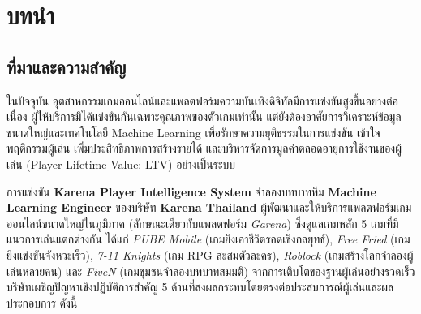 \documentclass[11pt,a4paper]{article}
\newcommand{\thaiFrontPage}{%
    \ifcase\value{page}\or ก\or ข\or ค\or ง\or จ\or ฉ\or ช\or ซ\else\arabic{page}\fi%
}
\renewcommand{\contentsname}{สารบัญ}
\begin{document}
\restoregeometry

\clearpage
{}
\renewcommand{\thepage}{\thaiFrontPage}
\renewcommand{\contentsname}{สารบัญ}
\tableofcontents

\clearpage
{}
\renewcommand{\thepage}{\arabic{page}}
\setlength{\parindent}{1.0cm}

\section{บทนำ}

\subsection{ที่มาและความสำคัญ}

ในปัจจุบัน อุตสาหกรรมเกมออนไลน์และแพลตฟอร์มความบันเทิงดิจิทัลมีการแข่งขันสูงขึ้นอย่างต่อเนื่อง ผู้ให้บริการมิได้แข่งขันกันเฉพาะคุณภาพของตัวเกมเท่านั้น แต่ยังต้องอาศัยการวิเคราะห์ข้อมูลขนาดใหญ่และเทคโนโลยี Machine Learning เพื่อรักษาความยุติธรรมในการแข่งขัน เข้าใจพฤติกรรมผู้เล่น เพิ่มประสิทธิภาพการสร้างรายได้ และบริหารจัดการมูลค่าตลอดอายุการใช้งานของผู้เล่น (Player Lifetime Value: LTV) อย่างเป็นระบบ

การแข่งขัน \textbf{Karena Player Intelligence System} จำลองบทบาททีม \textbf{Machine Learning Engineer} ของบริษัท \textbf{Karena Thailand} ผู้พัฒนาและให้บริการแพลตฟอร์มเกมออนไลน์ขนาดใหญ่ในภูมิภาค (ลักษณะเดียวกับแพลตฟอร์ม \textit{Garena}) ซึ่งดูแลเกมหลัก 5 เกมที่มีแนวการเล่นแตกต่างกัน ได้แก่ \textit{PUBE Mobile} (เกมยิงเอาชีวิตรอดเชิงกลยุทธ์), \textit{Free Fried} (เกมยิงแข่งขันจังหวะเร็ว), \textit{7-11 Knights} (เกม RPG สะสมตัวละคร), \textit{Roblock} (เกมสร้างโลกจำลองผู้เล่นหลายคน) และ \textit{FiveN} (เกมชุมชนจำลองบทบาทสมมติ) จากการเติบโตของฐานผู้เล่นอย่างรวดเร็ว บริษัทเผชิญปัญหาเชิงปฏิบัติการสำคัญ 5 ด้านที่ส่งผลกระทบโดยตรงต่อประสบการณ์ผู้เล่นและผลประกอบการ ดังนี้
\end{document}
